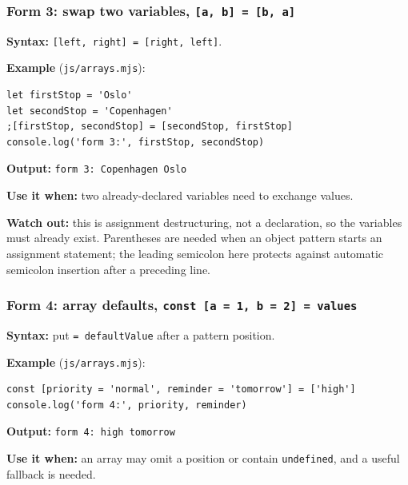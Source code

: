 \documentclass[
]{article}
\newcommand{\passthrough}[1]{#1}
\begin{document}
\subsubsection{\texorpdfstring{Form 3: swap two variables,
\texttt{{[}a,\ b{]}\ =\ {[}b,\ a{]}}}{Form 3: swap two variables, {[}a, b{]} = {[}b, a{]}}}\label{form-3-swap-two-variables-a-b--b-a}

\textbf{Syntax:}
\passthrough{\lstinline![left, right] = [right, left]!}.

\textbf{Example} (\passthrough{\lstinline!js/arrays.mjs!}):

\begin{lstlisting}
let firstStop = 'Oslo'
let secondStop = 'Copenhagen'
;[firstStop, secondStop] = [secondStop, firstStop]
console.log('form 3:', firstStop, secondStop)
\end{lstlisting}

\textbf{Output:} \passthrough{\lstinline!form 3: Copenhagen Oslo!}

\textbf{Use it when:} two already-declared variables need to exchange
values.

\textbf{Watch out:} this is assignment destructuring, not a declaration,
so the variables must already exist. Parentheses are needed when an
object pattern starts an assignment statement; the leading semicolon
here protects against automatic semicolon insertion after a preceding
line.

\subsubsection{\texorpdfstring{Form 4: array defaults,
\texttt{const\ {[}a\ =\ 1,\ b\ =\ 2{]}\ =\ values}}{Form 4: array defaults, const {[}a = 1, b = 2{]} = values}}\label{form-4-array-defaults-const-a--1-b--2--values}

\textbf{Syntax:} put \passthrough{\lstinline!= defaultValue!} after a
pattern position.

\textbf{Example} (\passthrough{\lstinline!js/arrays.mjs!}):

\begin{lstlisting}
const [priority = 'normal', reminder = 'tomorrow'] = ['high']
console.log('form 4:', priority, reminder)
\end{lstlisting}

\textbf{Output:} \passthrough{\lstinline!form 4: high tomorrow!}

\textbf{Use it when:} an array may omit a position or contain
\passthrough{\lstinline!undefined!}, and a useful fallback is needed.
\end{document}
